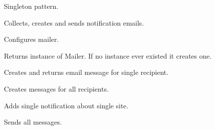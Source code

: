 \documentclass[letterpaper,10pt,english]{sphinxmanual}
\begin{document}
\begin{fulllineitems}
\label{index:spy.Mailer}
Singleton pattern.

Collects, creates and sends notification emails.

\begin{fulllineitems}
\label{index:spy.Mailer.configure}
Configures mailer.

\end{fulllineitems}


\begin{fulllineitems}
\label{index:spy.Mailer.get_instance}
Returns instance of Mailer.
If no instance ever existed it creates one.

\end{fulllineitems}


\begin{fulllineitems}
\label{index:spy.Mailer.make_email}
Creates and returns email message for single recipient.

\end{fulllineitems}


\begin{fulllineitems}
\label{index:spy.Mailer.make_messages}
Creates messages for all recipients.

\end{fulllineitems}


\begin{fulllineitems}
\label{index:spy.Mailer.prepare_notification}
Adds single notification about single site.

\end{fulllineitems}


\begin{fulllineitems}
\label{index:spy.Mailer.send_messages}
Sends all messages.

\end{fulllineitems}


\end{fulllineitems}
\end{document}
